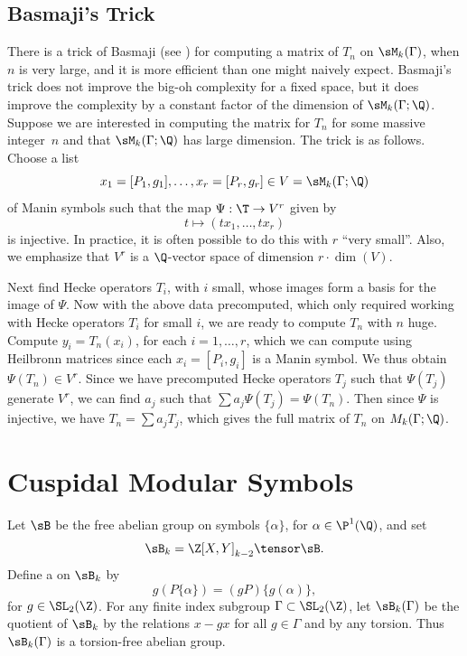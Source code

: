 \subsection{Basmaji's Trick}\label{sec:basmaji}
There is a trick of Basmaji (see \cite{basmaji:thesis}) for computing
a matrix of $T_n$ on $\sM_k(\Gamma)$, when $n$ is very large, and it is more
efficient than one might naively expect.  Basmaji's trick does not
improve the big-oh complexity for a fixed space, but it
does improve the
complexity by a constant factor of the dimension of $\sM_k(\Gamma;\Q)$.
Suppose we are interested in computing the matrix for $T_n$ for some massive
integer~$n$ and that $\sM_k(\Gamma;\Q)$ has large dimension.
The trick is as follows.  Choose a list 
$$x_1 =[P_1,g_1],\ldots,x_r = [P_r,g_r] \in V = \sM_k(\Gamma;\Q)$$ 
of Manin symbols  such that the
map $\Psi:\T \to V^r$
 given by $$t \mapsto (t x_1, \ldots, t x_r)$$
is injective.  In practice, it is often possible to do this with $r$ ``very small''.
Also, we emphasize that $V^r$ is a $\Q$-vector space of dimension 
$r\cdot \dim(V)$.

Next find Hecke operators $T_i$, with $i$ small, 
whose images form a basis for the image of $\Psi$.
Now with the above data precomputed, which only required working with
Hecke operators $T_i$ for small $i$, we are ready to compute $T_n$
with $n$ huge.  Compute $y_i = T_n(x_i)$, for each $i=1,\ldots, r$,
which we can compute using Heilbronn matrices since each
$x_i=[P_i,g_i]$ is a Manin symbol.  We thus obtain $\Psi(T_n) \in V^r.$
Since we have precomputed Hecke operators $T_j$ such that
$\Psi(T_j)$ generate $V^r$, we can find $a_j$ such that
$\sum a_j \Psi(T_j) = \Psi(T_n)$.  Then since $\Psi$
is injective, we have $T_n = \sum a_j T_j$, which gives
the full matrix of $T_n$ on $M_k(\Gamma;\Q)$.



\section{Cuspidal Modular Symbols}\label{sec:cuspmodsym}
Let $\sB$ be the free abelian group on symbols $\{\alpha\}$,
for $\alpha\in\P^1(\Q)$, and set
$$
  \sB_k = \Z[X,Y]_{k-2}\tensor\sB.
$$
Define a  on $\sB_k$ by
$$
  g  (P \{\alpha\}) = (gP) \{g(\alpha)\},
$$
for $g\in \SL_2(\Z)$.
For any finite index subgroup $\Gamma\subset \SL_2(\Z)$,
let 
$\sB_k(\Gamma)$ be the quotient of $\sB_k$ by the relations
$x- gx$ for all $g\in \Gamma$ and by any torsion.  Thus
$\sB_k(\Gamma)$ is a torsion-free abelian group.

